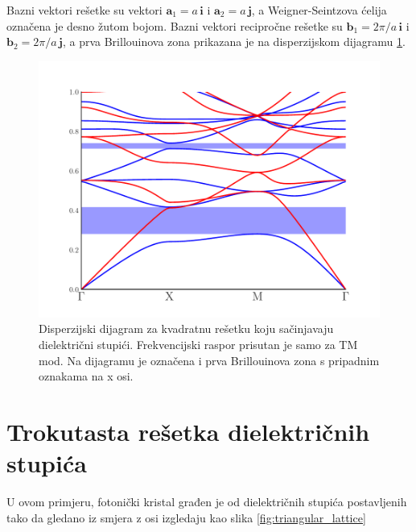 \documentclass[utf8, seminar, numeric]{fer}
\begin{document}
Bazni vektori rešetke su vektori ${\mathbf{a}_1 = a \, \mathbf{i}}$ i
${\mathbf{a}_2= a \, \mathbf{j}}$, a Weigner-Seintzova ćelija označena je
desno žutom bojom. Bazni vektori recipročne rešetke su
${\mathbf{b}_1 = 2 \pi/a \, \mathbf{i}}$ i
${\mathbf{b}_2 = 2 \pi/a \, \mathbf{j}}$, a prva Brillouinova zona prikazana
je na disperzijskom dijagramu \ref{fig:square_band_diagram}.

\begin{figure}[ht]
	\centering
	\includegraphics[width = 0.8\linewidth]{./images/pdf/square_lattice_rods_band_diagram.pdf}
	\caption{Disperzijski dijagram za kvadratnu rešetku koju sačinjavaju
	dielektrični stupići. Frekvencijski raspor prisutan je samo za TM mod. Na
	dijagramu je označena i prva Brillouinova zona s pripadnim oznakama na x osi.}
	\label{fig:square_band_diagram}
\end{figure}

\FloatBarrier

\section{Trokutasta rešetka dielektričnih stupića} \label{sec:triangle}

U ovom primjeru, fotonički kristal građen je od dielektričnih stupića
postavljenih tako da gledano iz smjera z osi izgledaju kao
slika \ref{fig:triangular_lattice}
\end{document}
